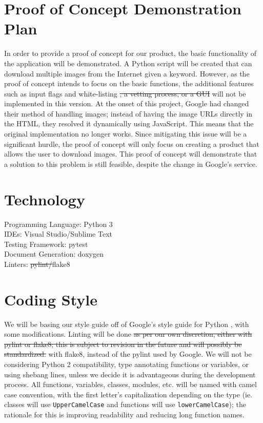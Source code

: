 \documentclass{article}
\begin{document}
\section{Proof of Concept Demonstration Plan}
In order to provide a proof of concept for our product, the basic functionality
of the application will be demonstrated. A Python script will be created that can
\color{red}d\color{black}ownload multiple images from the Internet given a keyword. 
However, as the proof of concept intends to focus on the basic functions, the 
additional features such as input flags \color{red}and \color{black}white-listing 
\st{, a vetting process, or a GUI} will not be implemented in this version. 
\color{red} At the onset of this project, Google had changed their method of 
handling images; instead of having the image URLs directly in the HTML, they 
resolved it dynamically using JavaScript. This means that the original 
implementation no longer works. Since mitigating this issue will be a significant 
hurdle, the proof of concept will only focus on creating a product that allows the 
user to download images. This proof of concept will demonstrate that a solution to 
this problem is still feasible, despite the change in Google's service.
\color{black}

\section{Technology}
Programming Language: Python 3 \\
IDEs: Visual Studio/Sublime Text \\
Testing Framework: pytest \\
Document Generation: doxygen \\
Linters: \st{pylint/}flake8

\section{Coding Style}
We will be basing our style guide off of Google’s style guide for Python 
\color{red} \cite{pythonguide}\color{black}, with some modifications. Linting will 
be done \st{as per our own discretion, either with pylint or flake8; this is 
subject to revision in the future and will possibly be standardized.} \color{red} 
with flake8, instead of the pylint used by Google. \color{black}We will not be 
considering Python 2 compatibility, type annotating 
functions or variables, or using shebang lines, unless we decide it is 
advantageous during the development process. All functions, variables, classes, 
modules, etc. will be named with camel case convention, with the first letter’s 
capitalization depending on the type (ie. classes will use 
\texttt{UpperCamelCase} and functions will use \texttt{lowerCamelCase}); the 
rationale for this is improving readability and reducing long function names.
\end{document}
